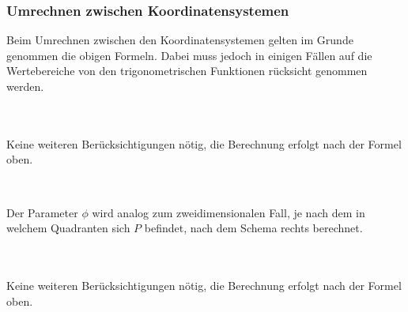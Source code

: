 \smallskip
\subsubsection{Umrechnen zwischen Koordinatensystemen}
Beim Umrechnen zwischen den Koordinatensystemen gelten im Grunde genommen die obigen Formeln. 
Dabei muss jedoch in einigen Fällen auf die Wertebereiche von den trigonometrischen Funktionen rücksicht genommen werden.

\\
\\
Keine weiteren Berücksichtigungen nötig, die Berechnung erfolgt nach der Formel oben.
\medskip

\\
\begin{minipage}{0.49\linewidth}
    Der Parameter $\phi$ wird analog zum zweidimensionalen Fall, je nach dem in welchem Quadranten sich $P$ befindet, nach dem Schema rechts berechnet.
\end{minipage}
\hfill
\begin{minipage}{0.49\linewidth}
    \begin{center}
    \end{center}
\end{minipage}
\medskip

\\
\\
Keine weiteren Berücksichtigungen nötig, die Berechnung erfolgt nach der Formel oben.
\medskip

